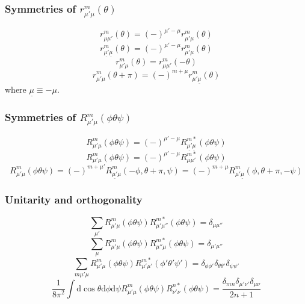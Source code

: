 \subsubsection*{Symmetries of $r_{\mu'\mu}^{m}(\theta)$}

\begin{equation}
r_{\mu\mu'}^{m}(\theta)=(-)^{\mu'-\mu}r_{\mu'\mu}^{m}(\theta)
\end{equation}
\begin{equation}
r_{\underline{\mu'}\underline{\mu}}^{m}(\theta)=\left(-\right)^{\mu'-\mu}r_{\mu'\mu}^{m}(\theta)\label{eq:symm-glp-1}
\end{equation}
\begin{equation}
r_{\mu'\mu}^{m}(\theta)=r_{\mu\mu'}^{m}(-\theta)
\end{equation}
\begin{equation}
r_{\mu'\mu}^{m}(\theta+\pi)=(-)^{m+\mu}r_{\mu'\underline{\mu}}^{m}(\theta)
\end{equation}
where $\underline{\mu}\equiv-\mu$.

\subsubsection*{Symmetries of $R_{\mu'\mu}^{m}(\phi\theta\psi)$}

\begin{equation}
R_{\mu'\mu}^{m}(\phi\theta\psi)=\left(-\right)^{\mu'-\mu}R_{\underline{\mu'}\underline{\mu}}^{m*}(\phi\theta\psi)\label{eq:symm-gsh-1}
\end{equation}
\begin{equation}
R_{\mu'\mu}^{m}(\phi\theta\psi)=\left(-\right)^{\mu'-\mu}R_{\mu\mu'}^{m*}(\phi\theta\psi)
\end{equation}
\begin{equation}
R_{\mu'\mu}^{m}(\phi\theta\psi)=(-)^{m+\mu'}R_{\underline{\mu'}\mu}^{m}(-\phi,\theta+\pi,\psi)=(-)^{m+\mu}R_{\mu'\underline{\mu}}^{m}(\phi,\theta+\pi,-\psi)
\end{equation}


\subsubsection*{Unitarity and orthogonality}

\begin{equation}
\sum_{\mu'}R_{\mu'\mu}^{m}(\phi\theta\psi)R_{\mu'\mu''}^{m*}(\phi\theta\psi)=\delta_{\mu\mu''}
\end{equation}
\begin{equation}
\sum_{\mu}R_{\mu'\mu}^{m}(\phi\theta\psi)R_{\mu''\mu}^{m*}(\phi\theta\psi)=\delta_{\mu'\mu''}
\end{equation}
\begin{equation}
\sum_{m\mu'\mu}R_{\mu'\mu}^{m}(\phi\theta\psi)R_{\mu'\mu'}^{m*}(\phi'\theta'\psi')=\delta_{\phi\phi'}\delta_{\theta\theta'}\delta_{\psi\psi'}
\end{equation}
\begin{equation}
\frac{1}{8\pi^{2}}\int\mathrm{d}\cos\theta\mathrm{d}\phi\mathrm{d}\psi R_{\mu'\mu}^{m}(\phi\theta\psi)R_{\nu'\nu}^{n*}(\phi\theta\psi)=\frac{\delta_{mn}\delta_{\mu'\nu'}\delta_{\mu\nu}}{2n+1}\label{eq:gsh-orthogonality}
\end{equation}


